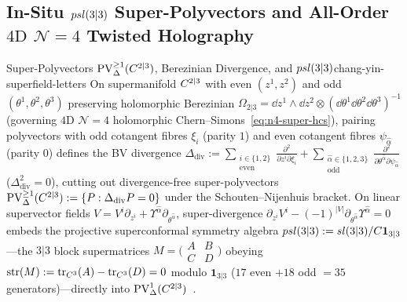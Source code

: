 \subsection{In-Situ \texorpdfstring{$psl(3|3)$}{psl(3|3)} Super-Polyvectors and All-Order \texorpdfstring{$4\mathrm{D}$ $\mathcal{N}=4$}{4D N=4} Twisted Holography}
\label{subsec:holography-allorder}

\begin{zkmodule}{Super-Polyvectors $\mathrm{PV}^{\ge 1}_\Delta(C^{2|3})$, Berezinian Divergence, and $psl(3|3)$}{chang-yin-superfield-letters}
On supermanifold $C^{2|3}$ with even $(z^1,z^2)$ and odd $(\theta^1,\theta^2,\theta^3)$ preserving holomorphic Berezinian $\Omega_{2|3} = \dd z^1\wedge\dd z^2\otimes(\dd\theta^1\dd\theta^2\dd\theta^3)^{-1}$ (governing $4\mathrm{D}$ $\mathcal{N}=4$ holomorphic Chern--Simons~\eqref{eq:n4-super-hcs}), pairing polyvectors with odd cotangent fibres $\xi_i$ (parity $1$) and even cotangent fibres $\psi_{\hat{\alpha}}$ (parity $0$) defines the BV divergence $\Delta_{\mathrm{div}} := \sum_{\substack{i\in\{1,2\}\\\mathrm{even}}}\frac{\partial^2}{\partial z^i\partial\xi_i} + \sum_{\substack{\hat{\alpha}\in\{1,2,3\}\\\mathrm{odd}}}\frac{\partial^2}{\partial\theta^{\hat{\alpha}}\partial\psi_{\hat{\alpha}}}$ ($\Delta_{\mathrm{div}}^2 = 0$), cutting out divergence-free super-polyvectors $\mathrm{PV}^{\ge 1}_\Delta(C^{2|3}) := \{P : \Delta_{\mathrm{div}}P = 0\}$ under the Schouten--Nijenhuis bracket. On linear supervector fields $V = V^i\partial_{z^i} + \Upsilon^{\hat{\alpha}}\partial_{\theta^{\hat{\alpha}}}$, super-divergence $\partial_{z^i}V^i - (-1)^{|V|}\partial_{\theta^{\hat{\alpha}}}\Upsilon^{\hat{\alpha}} = 0$ embeds the projective superconformal symmetry algebra $psl(3|3) := sl(3|3)/C\mathbf{1}_{3|3}$---the $3|3$ block supermatrices $M = \bigl(\begin{smallmatrix}A & B\\ C & D\end{smallmatrix}\bigr)$ obeying $\operatorname{str}(M) := \operatorname{tr}_{C^3}(A) - \operatorname{tr}_{C^3}(D) = 0$ modulo $\mathbf{1}_{3|3}$ ($17$ even $+ 18$ odd $= 35$ generators)---directly into $\mathrm{PV}^1_\Delta(C^{2|3})$~\cite{CG18,SW}.
\end{zkmodule}

